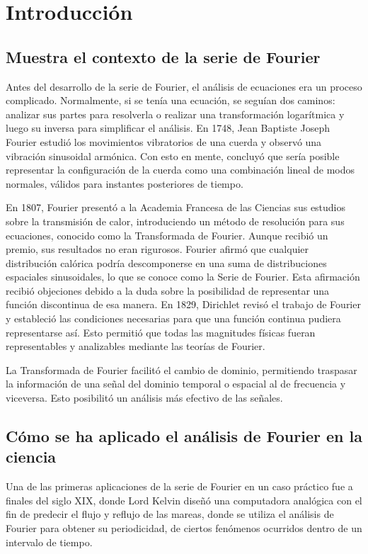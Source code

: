 \section{Introducción}

\subsection{Muestra el contexto de la serie de Fourier}

Antes del desarrollo de la serie de Fourier, el análisis de ecuaciones era un proceso complicado. Normalmente, si se tenía una ecuación, se seguían dos caminos: analizar sus partes para resolverla o realizar una transformación logarítmica y luego su inversa para simplificar el análisis. En 1748, Jean Baptiste Joseph Fourier estudió los movimientos vibratorios de una cuerda y observó una vibración sinusoidal armónica. Con esto en mente, concluyó que sería posible representar la configuración de la cuerda como una combinación lineal de modos normales, válidos para instantes posteriores de tiempo.

En 1807, Fourier presentó a la Academia Francesa de las Ciencias sus estudios sobre la transmisión de calor, introduciendo un método de resolución para sus ecuaciones, conocido como la Transformada de Fourier. Aunque recibió un premio, sus resultados no eran rigurosos. Fourier afirmó que cualquier distribución calórica podría descomponerse en una suma de distribuciones espaciales sinusoidales, lo que se conoce como la Serie de Fourier. Esta afirmación recibió objeciones debido a la duda sobre la posibilidad de representar una función discontinua de esa manera. En 1829, Dirichlet revisó el trabajo de Fourier y estableció las condiciones necesarias para que una función continua pudiera representarse así. Esto permitió que todas las magnitudes físicas fueran representables y analizables mediante las teorías de Fourier.

La Transformada de Fourier facilitó el cambio de dominio, permitiendo traspasar la información de una señal del dominio temporal o espacial al de frecuencia y viceversa. Esto posibilitó un análisis más efectivo de las señales.

\subsection{Cómo se ha aplicado el análisis de Fourier en la ciencia}

Una de las primeras aplicaciones de la serie de Fourier en un caso práctico fue a finales del siglo XIX, donde Lord Kelvin diseñó una computadora analógica con el fin de predecir el flujo y reflujo de las mareas, donde se utiliza el análisis de Fourier para obtener su periodicidad, de ciertos fenómenos ocurridos dentro de un intervalo de tiempo.

